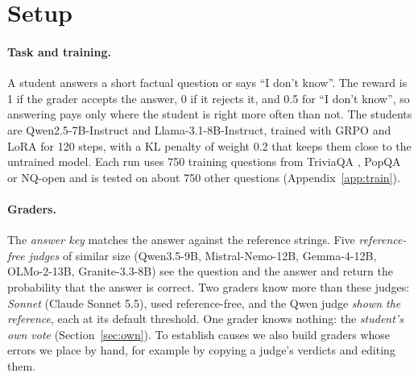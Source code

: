 \documentclass[11pt,a4paper,twocolumn]{article}
\newcommand{\idk}{``I don't know''}
\begin{document}
\section{Setup}

\paragraph{Task and training.} A student answers a short factual question or says \idk{}. The reward is 1 if the grader accepts the answer, 0 if it rejects it, and 0.5 for \idk{}, so answering pays only where the student is right more often than not. The students are Qwen2.5-7B-Instruct and Llama-3.1-8B-Instruct, trained with GRPO \citep{shao2024grpo} and LoRA \citep{hu2022lora} for 120 steps, with a KL penalty of weight 0.2 that keeps them close to the untrained model. Each run uses 750 training questions from TriviaQA \citep{joshi2017}, PopQA \citep{mallen2023} or NQ-open \citep{kwiatkowski2019,lee2019} and is tested on about 750 other questions (Appendix~\ref{app:train}).

\paragraph{Graders.} The \emph{answer key} matches the answer against the reference strings. Five \emph{reference-free judges} of similar size (Qwen3.5-9B, Mistral-Nemo-12B, Gemma-4-12B, OLMo-2-13B, Granite-3.3-8B) see the question and the answer and return the probability that the answer is correct. Two graders know more than these judges: \emph{Sonnet} (Claude Sonnet 5.5), used reference-free, and the Qwen judge \emph{shown the reference}, each at its default threshold. One grader knows nothing: the \emph{student's own vote} (Section~\ref{sec:own}). To establish causes we also build graders whose errors we place by hand, for example by copying a judge's verdicts and editing them.
\end{document}
